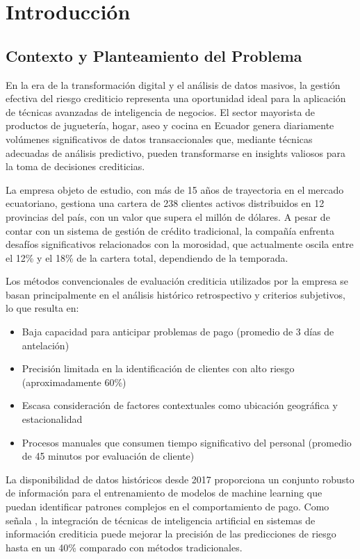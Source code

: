 \chapter{Introducción}

\section{Contexto y Planteamiento del Problema}

En la era de la transformación digital y el análisis de datos masivos, la gestión efectiva del riesgo crediticio representa una oportunidad ideal para la aplicación de técnicas avanzadas de inteligencia de negocios. El sector mayorista de productos de juguetería, hogar, aseo y cocina en Ecuador genera diariamente volúmenes significativos de datos transaccionales que, mediante técnicas adecuadas de análisis predictivo, pueden transformarse en insights valiosos para la toma de decisiones crediticias.

La empresa objeto de estudio, con más de 15 años de trayectoria en el mercado ecuatoriano, gestiona una cartera de 238 clientes activos distribuidos en 12 provincias del país, con un valor que supera el millón de dólares. A pesar de contar con un sistema de gestión de crédito tradicional, la compañía enfrenta desafíos significativos relacionados con la morosidad, que actualmente oscila entre el 12\% y el 18\% de la cartera total, dependiendo de la temporada.

Los métodos convencionales de evaluación crediticia utilizados por la empresa se basan principalmente en el análisis histórico retrospectivo y criterios subjetivos, lo que resulta en:

\begin{itemize}
    \item Baja capacidad para anticipar problemas de pago (promedio de 3 días de antelación)
    \item Precisión limitada en la identificación de clientes con alto riesgo (aproximadamente 60\%)
    \item Escasa consideración de factores contextuales como ubicación geográfica y estacionalidad
    \item Procesos manuales que consumen tiempo significativo del personal (promedio de 45 minutos por evaluación de cliente)
\end{itemize}

La disponibilidad de datos históricos desde 2017 proporciona un conjunto robusto de información para el entrenamiento de modelos de machine learning que puedan identificar patrones complejos en el comportamiento de pago. Como señala \cite{torres2023inteligencia}, la integración de técnicas de inteligencia artificial en sistemas de información crediticia puede mejorar la precisión de las predicciones de riesgo hasta en un 40\% comparado con métodos tradicionales.


